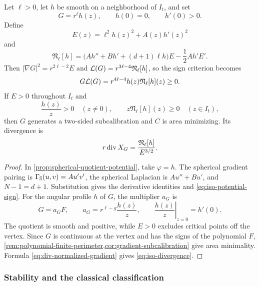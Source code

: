 \begin{proposition}
\label{prop:iso-master}
Let \(\ell>0\), let \(h\) be smooth on a neighborhood of \(I_t\), and set
\[
 G=r^\ell h(z),\qquad h(0)=0,\qquad h'(0)>0.
\]
Define
\begin{equation}\label{eq:E-h}
 E(z)=\ell^2h(z)^2+A(z)h'(z)^2
\end{equation}
and
\begin{equation}\label{eq:N-h}
 \mathfrak N_\ell[h]
 =\bigl(Ah''+Bh'+(d+1)\ell h\bigr)E
                  -\frac12Ah'E'.
\end{equation}
Then \(|\nabla G|^2=r^{2\ell-2}E\) and
\(\mathcal L(G)=r^{3\ell-4}\mathfrak N_\ell[h]\), so the sign criterion becomes
\begin{equation}\label{eq:iso-potential-sign}
 G\mathcal L(G)=r^{4\ell-4}h(z)\mathfrak N_\ell[h](z)\geq0.
\end{equation}
If \(E>0\) throughout \(I_t\) and
\begin{equation}\label{eq:h-sign-criterion}
 \frac{h(z)}z>0\quad(z\neq0),\qquad
 z\mathfrak N_\ell[h](z)\geq0\quad(z\in I_t),
\end{equation}
then \(G\) generates a two-sided subcalibration and \(C\) is area minimizing.
Its divergence is
\begin{equation}\label{eq:iso-divergence}
 r\operatorname{div} X_G=\frac{\mathfrak N_\ell[h]}{E^{3/2}}.
\end{equation}
\end{proposition}

\begin{proof}
In \cref{prop:spherical-quotient-potential}, take \(\varphi=h\).
The spherical gradient
pairing is \(\Gamma_{\mathbb S}(u,v)=Au'v'\), the spherical Laplacian is
\(Au''+Bu'\), and \(N-1=d+1\). Substitution gives the derivative identities and \eqref{eq:iso-potential-sign}.
For the angular profile \(h\) of \(G\), the multiplier \(a_G\) is
\[
 G=a_GF,\qquad a_G=r^{\ell-g}\frac{h(z)}z,
 \qquad \left.\frac{h(z)}z\right|_{z=0}=h'(0).
\]
The quotient is smooth and positive, while \(E>0\) excludes
critical points off the vertex. Since \(G\) is continuous at the
vertex and has the signs of the polynomial \(F\),
\cref{rem:polynomial-finite-perimeter,cor:gradient-subcalibration}
give area minimality. Formula \eqref{eq:div-normalized-gradient}
gives \eqref{eq:iso-divergence}.
\end{proof}

\subsubsection{Stability and the classical classification}

